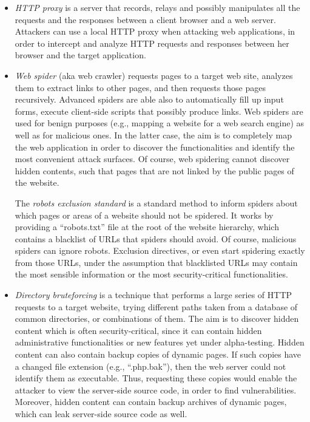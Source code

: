 \documentclass[a4paper,12pt]{article}
\begin{document}
\begin{itemize}
	\item \textit{HTTP proxy} is a server that records, relays and possibly manipulates all the requests and the responses between a client browser and a web server. Attackers can use a local HTTP proxy when attacking web applications, in order to intercept and analyze HTTP requests and responses between her browser and the target application.
	\item \textit{Web spider} (aka web crawler) requests pages to a target web site, analyzes them to extract links to other pages, and then requests those pages recursively. Advanced spiders are able also to automatically fill up input forms, execute client-side scripts that possibly produce links. Web spiders are used for benign purposes (e.g., mapping a website for a web search engine) as well as for malicious ones. In the latter case, the aim is to completely map the web application in order to discover the functionalities and identify the most convenient attack surfaces. Of course, web spidering cannot discover hidden contents, such that pages that are not linked by the public pages of the website.

	The \textit{robots exclusion standard} is a standard method to inform spiders about which pages or areas of a website should not be spidered. It works by providing a “robots.txt” file at the root of the website hierarchy, which contains a blacklist of URLs that spiders should avoid. Of course, malicious spiders can ignore robots. Exclusion directives, or even start spidering exactly from those URLs, under the assumption that blacklisted URLs may contain the most sensible information or the most security-critical functionalities.
	\item \textit{Directory bruteforcing} is a technique that performs a large series of HTTP requests to a target website, trying different paths taken from a database of common directories, or combinations of them. The aim is to discover hidden content which is often security-critical, since it can contain hidden administrative functionalities or new features yet under alpha-testing. Hidden content can also contain backup copies of dynamic pages. If such copies have a changed file extension (e.g., “.php.bak”), then the web server could not identify them as executable. Thus, requesting these copies would enable the attacker to view the server-side source code, in order to find vulnerabilities. Moreover, hidden content can contain backup archives of dynamic pages, which can leak server-side source code as well.
\end{itemize}
\end{document}
